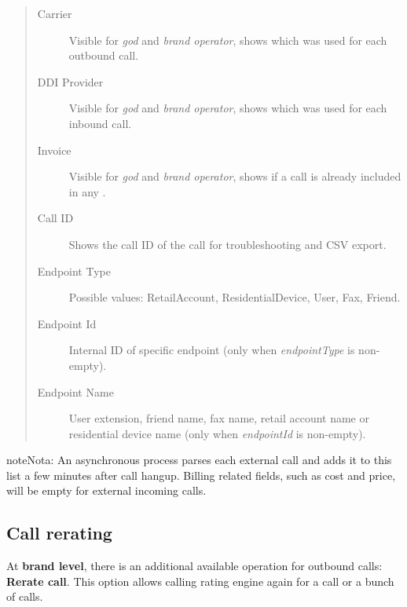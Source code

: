 \documentclass[letterpaper,10pt,spanish]{sphinxmanual}
\begin{document}
\begin{quote}
\begin{description}
\item[{Carrier}] \leavevmode
Visible for \emph{god} and \emph{brand operator}, shows which {\hyperref[administration_portal/brand/providers/carriers:carriers]{}} was used for each outbound call.

\item[{DDI Provider}] \leavevmode
Visible for \emph{god} and \emph{brand operator}, shows which {\hyperref[administration_portal/brand/providers/ddi_providers:ddi\string-providers]{}} was used for each inbound call.

\item[{Invoice}] \leavevmode
Visible for \emph{god} and \emph{brand operator}, shows if a call is already included in any {\hyperref[administration_portal/brand/invoicing/invoices:invoices]{}}.

\item[{Call ID}] \leavevmode
Shows the call ID of the call for troubleshooting and CSV export.

\item[{Endpoint Type}] \leavevmode
Possible values: RetailAccount, ResidentialDevice, User, Fax, Friend.

\item[{Endpoint Id}] \leavevmode
Internal ID of specific endpoint (only when \emph{endpointType} is non-empty).

\item[{Endpoint Name}] \leavevmode
User extension, friend name, fax name, retail account name or residential device name (only when \emph{endpointId} is non-empty).

\end{description}
\end{quote}

\begin{notice}{note}{Nota:}
An asynchronous process parses each external call and adds it to this list a few minutes after call hangup. Billing related fields, such as cost and price, will be empty for external incoming calls.
\end{notice}


\subsection{Call rerating}
\label{administration_portal/platform/external_calls:call-rerating}
At \textbf{brand level}, there is an additional available operation for outbound calls: \textbf{Rerate call}. This option allows calling rating engine again for a call or a bunch of calls.
\end{document}
